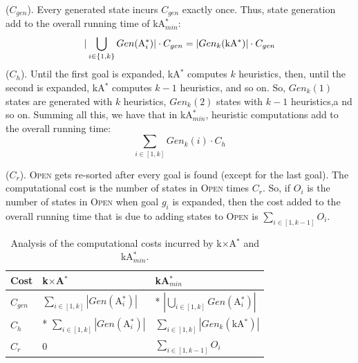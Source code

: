\documentclass{aicom2e}
\newcommand{\kgs}{$k$GP}
\newcommand{\kastar}{kA$^*$}
\newcommand{\kastarmin}{kA$^*_{min}$}
\newcommand{\kxastar}{k$\times$A$^*$}
\newcommand{\astari}[1]{A$^*_#1$}
\newcommand{\open}{\textsc{Open}}
\begin{document}
 ($C_{gen}$). Every generated state incurs
$C_{gen}$ exactly once. Thus, state generation add to the overall running time of \kastarmin{}:
\[
|\bigcup_{i\in{\{1,k\}}} Gen(\text{\astari{i}})|\cdot C_{gen} =
|Gen_k(\text{\kastar{}})|\cdot C_{gen}  \displaystyle
\]
 ($C_{h}$).
Until the first goal is expanded, \kastar{} computes $k$ heuristics,
then, until the second is expanded, \kastar{} computes $k-1$ heuristics, and so on.
So, $Gen_k(1)$ states are generated with $k$ heuristics,
$Gen_{k}(2)$ states with $k-1$ heuristics,a nd so on. Summing all this, we have that
in \kastarmin{}, heuristic computations add to the overall running time:
\[ \sum_{i\in[1,k]} Gen_k(i)\cdot C_h \]


 ($C_r$).
\open{} gets re-sorted after every goal is found (except for the last goal).
The computational cost is the number of states in \open{} times $C_r$.
So, if $O_i$ is the number of states in \open{} when goal $g_i$ is expanded, then
the cost added to the overall running time that is due to adding states to \open{} is $\sum_{i\in[1,k-1]} O_i$.

\begin{table}
    \begin{tabular}{|l|l|l|}
        \hline
        Cost        & \kxastar{}                                    & \kastarmin \\ \hline
        $C_{gen}$   & $\sum_{i\in[1,k]} |Gen(\text{\astari{i}})|$       & * $|\bigcup_{i\in[1,k]} Gen(\text{\astari{i}})|$\\
        $C_{h}$     & * $\sum_{i\in[1,k]} |Gen(\text{\astari{i}})|$     & $\sum_{i\in[1,k]} |Gen_k(\text{\kastar{}})|$\\
        $C_r$       &   0                                               & $\sum_{i\in[1,k-1]} O_i$\\
        \hline
    \end{tabular}
       \caption{Analysis of the computational costs incurred by \kxastar{} and \kastarmin{}.}
   \label{tab:time-analysis}
\end{table}
\end{document}
